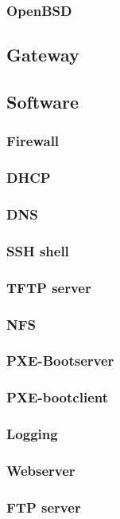 \documentclass[12pt]{article}
\begin{document}
\subsubsection{OpenBSD}

\subsection{Gateway}
\subsection{Software}
\subsubsection{Firewall}
\subsubsection{DHCP}
\subsubsection{DNS}
\subsubsection{SSH shell}
\subsubsection{TFTP server}
\subsubsection{NFS}
\subsubsection{PXE-Bootserver}
\subsubsection{PXE-bootclient}
\subsubsection{Logging}
\subsubsection{Webserver}
\subsubsection{FTP server}
\end{document}
